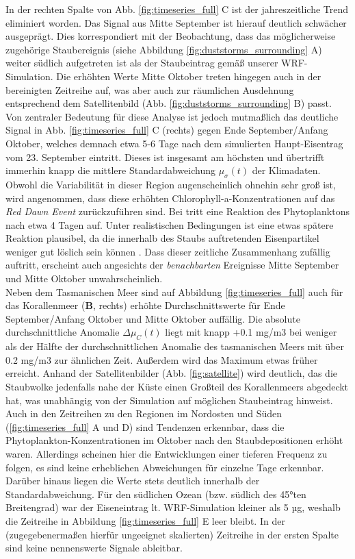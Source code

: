 \documentclass[12pt,a4paper,onecolumn]{scrartcl}
\begin{document}
In der rechten Spalte von Abb. \ref{fig:timeseries_full} C ist der jahreszeitliche Trend eliminiert worden. Das Signal aus Mitte September ist hierauf deutlich schwächer ausgeprägt. Dies korrespondiert mit der Beobachtung, dass das möglicherweise zugehörige Staubereignis (siehe Abbildung \ref{fig:duststorms_surrounding} A) weiter südlich aufgetreten ist als der Staubeintrag gemäß unserer WRF-Simulation. Die erhöhten Werte Mitte Oktober treten hingegen auch in der bereinigten Zeitreihe auf, was aber auch zur räumlichen Ausdehnung entsprechend dem Satellitenbild (Abb. \ref{fig:duststorms_surrounding} B) passt. Von zentraler Bedeutung für diese Analyse ist jedoch mutmaßlich das deutliche Signal in Abb. \ref{fig:timeseries_full} C (rechts) gegen Ende September/Anfang Oktober, welches demnach etwa 5-6 Tage nach dem simulierten Haupt-Eisentrag vom 23. September eintritt. Dieses ist insgesamt am höchsten und übertrifft immerhin knapp die mittlere Standardabweichung $\mu_\sigma(t)$ der Klimadaten. Obwohl die Variabilität in dieser Region augenscheinlich ohnehin sehr groß ist, wird angenommen, dass diese erhöhten Chlorophyll-a-Konzentrationen auf das \textit{Red Dawn Event} zurückzuführen sind. Bei \citet{Martin.1988} tritt eine Reaktion des Phytoplanktons nach etwa 4 Tagen auf. Unter realistischen Bedingungen ist eine etwas spätere Reaktion plausibel, da die innerhalb des Staubs auftretenden Eisenpartikel weniger gut löslich sein können \citep{Shao.2011}. Dass dieser zeitliche Zusammenhang zufällig auftritt, erscheint auch angesichts der \textit{benachbarten} Ereignisse Mitte September und Mitte Oktober unwahrscheinlich. \\

Neben dem Tasmanischen Meer sind auf Abbildung \ref{fig:timeseries_full} auch für das Korallenmeer (\textbf{B}, rechts) erhöhte Durchschnittswerte für Ende September/Anfang Oktober und Mitte Oktober auffällig. Die absolute durchschnittliche Anomalie $\Delta \mu_C(t)$ liegt mit knapp +0.1 mg/m3 bei weniger als der Hälfte der durchschnittlichen Anomalie des tasmanischen Meers mit über 0.2 mg/m3 zur ähnlichen Zeit. Außerdem wird das Maximum etwas früher erreicht. Anhand der Satellitenbilder (Abb. \ref{fig:satellite}) wird deutlich, das die Staubwolke jedenfalls nahe der Küste einen Großteil des Korallenmeers abgedeckt hat, was unabhängig von der Simulation auf möglichen Staubeintrag hinweist. Auch in den Zeitreihen zu den Regionen im Nordosten und Süden (\ref{fig:timeseries_full} A und D) sind Tendenzen erkennbar, dass die Phytoplankton-Konzentrationen im Oktober nach den Staubdepositionen erhöht waren. Allerdings scheinen hier die Entwicklungen einer tieferen Frequenz zu folgen, es sind keine erheblichen Abweichungen für einzelne Tage erkennbar. Darüber hinaus liegen die Werte stets deutlich innerhalb der Standardabweichung. Für den südlichen Ozean (bzw. südlich des 45°ten Breitengrad) war der Eiseneintrag lt. WRF-Simulation kleiner als 5 µg, weshalb die Zeitreihe in Abbildung \ref{fig:timeseries_full} E leer bleibt. In der (zugegebenermaßen hierfür ungeeignet skalierten) Zeitreihe in der ersten Spalte sind keine nennenswerte Signale ableitbar.
\end{document}
